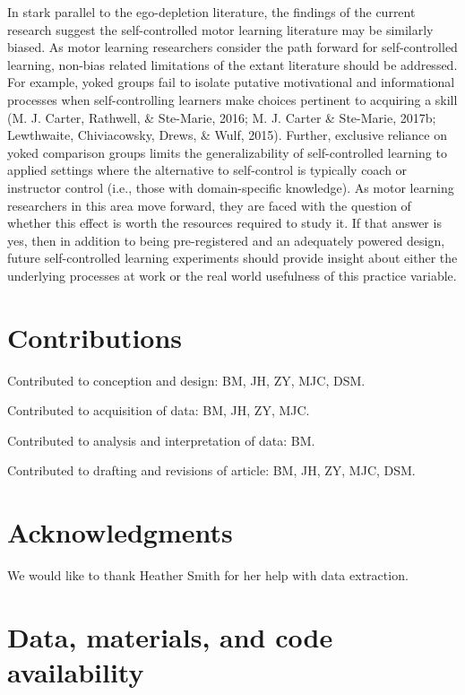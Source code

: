 \documentclass[
  english,
  man,floatsintext]{apa7}
\begin{document}
In stark parallel to the ego-depletion literature, the findings of the current research suggest the self-controlled motor learning literature may be similarly biased. As motor learning researchers consider the path forward for self-controlled learning, non-bias related limitations of the extant literature should be addressed. For example, yoked groups fail to isolate putative motivational and informational processes when self-controlling learners make choices pertinent to acquiring a skill (M. J. Carter, Rathwell, \& Ste-Marie, 2016; M. J. Carter \& Ste-Marie, 2017b; Lewthwaite, Chiviacowsky, Drews, \& Wulf, 2015). Further, exclusive reliance on yoked comparison groups limits the generalizability of self-controlled learning to applied settings where the alternative to self-control is typically coach or instructor control (i.e., those with domain-specific knowledge). As motor learning researchers in this area move forward, they are faced with the question of whether this effect is worth the resources required to study it. If that answer is yes, then in addition to being pre-registered and an adequately powered design, future self-controlled learning experiments should provide insight about either the underlying processes at work or the real world usefulness of this practice variable.

\hypertarget{contributions}{%
\section{Contributions}\label{contributions}}

Contributed to conception and design: BM, JH, ZY, MJC, DSM.

Contributed to acquisition of data: BM, JH, ZY, MJC.

Contributed to analysis and interpretation of data: BM.

Contributed to drafting and revisions of article: BM, JH, ZY, MJC, DSM.

\hypertarget{acknowledgments}{%
\section{Acknowledgments}\label{acknowledgments}}

We would like to thank Heather Smith for her help with data extraction.

\hypertarget{data-materials-and-code-availability}{%
\section{Data, materials, and code availability}\label{data-materials-and-code-availability}}
\end{document}
